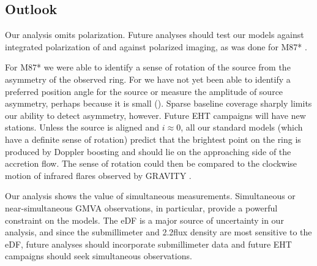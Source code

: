 


\subsection{Outlook}\label{sec:future}

Our analysis omits polarization. Future analyses should test our models against integrated polarization of \sgra \citep{2021ApJ...910L..14G} and against polarized imaging, as was done for M87* .

For M87* we were able to identify a sense of rotation of the source from the asymmetry of the observed ring.  For \sgra we have not yet been able to identify a preferred position angle for the source or measure the amplitude of source asymmetry, perhaps because it is small ().  Sparse baseline coverage sharply limits our ability to detect asymmetry, however.  Future EHT campaigns will have new stations.  Unless the source is aligned and $i \approx 0$, all our standard models (which have a definite sense of rotation) predict that the brightest point on the ring is produced by Doppler boosting and should lie on the approaching side of the accretion flow.  The sense of rotation could then be compared to the clockwise motion of infrared flares observed by GRAVITY \citep{2018A&A...618L..10G}.

Our analysis shows the value of simultaneous measurements.  Simultaneous or near-simultaneous GMVA observations, in particular, provide a powerful constraint on the models.  The eDF is a major source of uncertainty in our analysis, and since the submillimeter and 2.2\um flux density are most sensitive to the eDF, future analyses should incorporate submillimeter data and future EHT campaigns should seek simultaneous observations.

